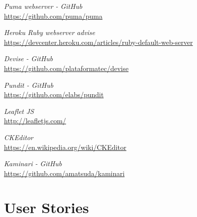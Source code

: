 \documentclass[a4paper]{article}
\begin{document}

\begin{thebibliography}{9}

\emph{Puma webserver - GitHub}\\
\url{https://github.com/puma/puma}

\emph{Heroku Ruby webserver advise}\\
\url {https://devcenter.heroku.com/articles/ruby-default-web-server}

\emph{Devise - GitHub}\\
\url{https://github.com/plataformatec/devise}

\emph{Pundit - GitHub}\\
\url{https://github.com/elabs/pundit}

\emph{Leaflet JS}\\
\url{http://leafletjs.com/}

\emph{CKEditor}\\
\url{https://en.wikipedia.org/wiki/CKEditor}

\emph{Kaminari - GitHub}\\
\url{https://github.com/amatsuda/kaminari}

\end{thebibliography}

\pagebreak
\appendix

\section{User Stories}
\label{sec:user-stories}
\end{document}
